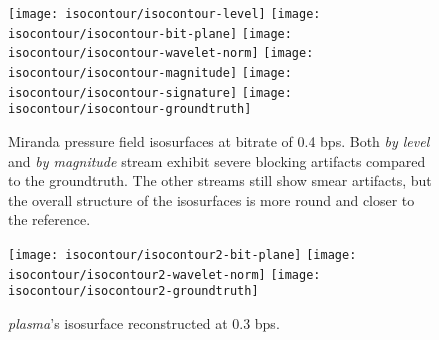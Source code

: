 \begin{figure}[h]
	\centering
	{\texttt{[image: isocontour/isocontour-level]}}
	{\texttt{[image: isocontour/isocontour-bit-plane]}}
	{\texttt{[image: isocontour/isocontour-wavelet-norm]}}
	{\texttt{[image: isocontour/isocontour-magnitude]}}
	{\texttt{[image: isocontour/isocontour-signature]}}
	{\texttt{[image: isocontour/isocontour-groundtruth]}}
	\caption{Miranda pressure field isosurfaces at bitrate of 0.4 bps. Both {\em by level}
        and {\em by magnitude} stream exhibit severe blocking artifacts compared to the groundtruth.
        The other streams still show smear artifacts, but the overall structure of the isosurfaces
        is more round and closer to the reference.}
	\label{fig:isocontour-surfaces-pressure}
\end{figure}

\begin{figure}[h]
	\centering
	{\texttt{[image: isocontour/isocontour2-bit-plane]}}
	{\texttt{[image: isocontour/isocontour2-wavelet-norm]}}
	{\texttt{[image: isocontour/isocontour2-groundtruth]}}
	\caption{\emph{plasma}'s isosurface reconstructed at 0.3 bps.}
	\label{fig:isocontour-surfaces-plasma}
\end{figure}

